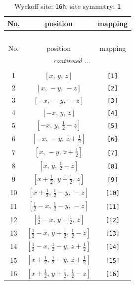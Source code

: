 \documentclass[fleqn,8pt]{jsarticle}
\begin{document}
\begin{longtable}{ccc}
\caption{Wyckoff site: {\tt 16h}, site symmetry: {\tt 1}}
 \\
 \hline \hline
No. & position & mapping \\ \hline \endfirsthead

\multicolumn{2}{l}{\tablename\ \thetable{}} \\
 \hline \hline
No. & position & mapping \\ \hline \endhead

 \hline \hline
\multicolumn{2}{r}{\footnotesize\it continued ...} \\ \endfoot

 \hline \hline
\multicolumn{2}{r}{} \\ \endlastfoot

1 & $\left[ x,\, y,\, z \right]$ & {\tt [1]} \\ \hline
2 & $\left[ x,\, - y,\, - z \right]$ & {\tt [2]} \\ \hline
3 & $\left[ - x,\, - y,\, - z \right]$ & {\tt [3]} \\ \hline
4 & $\left[ - x,\, y,\, z \right]$ & {\tt [4]} \\ \hline
5 & $\left[ - x,\, y,\, \frac{1}{2} - z \right]$ & {\tt [5]} \\ \hline
6 & $\left[ - x,\, - y,\, z + \frac{1}{2} \right]$ & {\tt [6]} \\ \hline
7 & $\left[ x,\, - y,\, z + \frac{1}{2} \right]$ & {\tt [7]} \\ \hline
8 & $\left[ x,\, y,\, \frac{1}{2} - z \right]$ & {\tt [8]} \\ \hline
9 & $\left[ x + \frac{1}{2},\, y + \frac{1}{2},\, z \right]$ & {\tt [9]} \\ \hline
10 & $\left[ x + \frac{1}{2},\, \frac{1}{2} - y,\, - z \right]$ & {\tt [10]} \\ \hline
11 & $\left[ \frac{1}{2} - x,\, \frac{1}{2} - y,\, - z \right]$ & {\tt [11]} \\ \hline
12 & $\left[ \frac{1}{2} - x,\, y + \frac{1}{2},\, z \right]$ & {\tt [12]} \\ \hline
13 & $\left[ \frac{1}{2} - x,\, y + \frac{1}{2},\, \frac{1}{2} - z \right]$ & {\tt [13]} \\ \hline
14 & $\left[ \frac{1}{2} - x,\, \frac{1}{2} - y,\, z + \frac{1}{2} \right]$ & {\tt [14]} \\ \hline
15 & $\left[ x + \frac{1}{2},\, \frac{1}{2} - y,\, z + \frac{1}{2} \right]$ & {\tt [15]} \\ \hline
16 & $\left[ x + \frac{1}{2},\, y + \frac{1}{2},\, \frac{1}{2} - z \right]$ & {\tt [16]} \\
\end{longtable}
\end{document}
